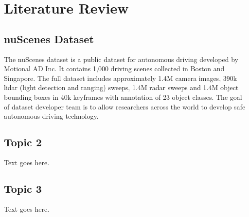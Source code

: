 \chapter{Literature Review}


\section{nuScenes Dataset}

The nuScenes dataset is a public dataset for autonomous driving developed by Motional AD Inc. It contains 1,000 driving scenes collected in Boston and Singapore. The full dataset includes approximately 1.4M camera images, 390k lidar (light detection and ranging) sweeps, 1.4M radar sweeps and 1.4M object bounding boxes in 40k keyframes with annotation of 23 object classes. The goal of dataset developer team is to allow researchers across the world to develop safe autonomous driving technology. \cite{nuscenes2019}

\section{Topic 2}

Text goes here.

\section{Topic 3}

Text goes here.


